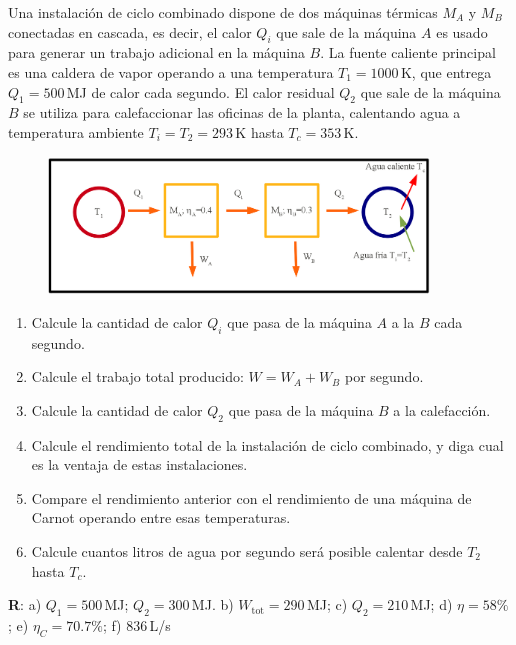 \documentclass[a4paper,12pt]{article}
\begin{document}
\begin{enumerate}
		Una instalación de ciclo combinado dispone de dos máquinas térmicas
		$M_A$ y $M_B$ conectadas en cascada, es decir, el calor $Q_i$ que sale
		de la máquina $A$ es usado para generar un trabajo adicional en la
		máquina $B$. La fuente caliente principal es una caldera de vapor
		operando a una temperatura $T_1=1000$\,K, que entrega $Q_1=500$\,MJ de
		calor cada segundo. El calor residual $Q_2$ que sale de la máquina $B$
		se utiliza para calefaccionar las oficinas de la planta, calentando
		agua a temperatura ambiente $T_i=T_2=293$\,K hasta $T_c=353$\,K.
		\begin{figure}[hhhhhb!]
			\centering
			\includegraphics[width=0.9\textwidth]{maq2}
		\end{figure}
		\begin{enumerate}
			\item Calcule la cantidad de calor $Q_i$ que pasa de la máquina $A$
				a la $B$ cada segundo.
			\item Calcule el trabajo total producido: $W=W_A+W_B$ por segundo.
			\item Calcule la cantidad de calor $Q_2$ que pasa de la máquina $B$
				a la calefacción.
			\item Calcule el rendimiento total de la instalación de ciclo
				combinado, y diga cual es la ventaja de estas instalaciones.
			\item Compare el rendimiento anterior con el rendimiento de una
				máquina de Carnot operando entre esas temperaturas.
			\item Calcule cuantos litros de agua por segundo será posible
				calentar desde $T_2$ hasta $T_c$.
		\end{enumerate}
		{\bf{R}}: a) $Q_1=500$\,MJ; $Q_2=300$\,MJ. b) $W_{\mathrm{tot}}=290$\,MJ; c) $Q_2=210$\,MJ; d) $\eta=58\%$; e) $\eta_C=70.7\%$; f) $836$\,L/s
		
\end{enumerate}
\end{document}
